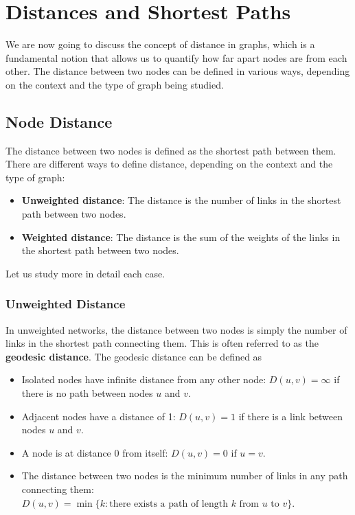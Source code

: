 \section{Distances and Shortest Paths}

We are now going to discuss the concept of distance in graphs, which is a fundamental notion that allows us to quantify how far apart nodes are from each other. The distance between two nodes can be defined in various ways, depending on the context and the type of graph being studied.

\subsection{Node Distance}
The distance between two nodes is defined as the shortest path between them. There are different ways to define distance, depending on the context and the type of graph:
\begin{itemize}
    \item \textbf{Unweighted distance}: The distance is the number of links in the shortest path between two nodes.
    \item \textbf{Weighted distance}: The distance is the sum of the weights of the links in the shortest path between two nodes.
\end{itemize}
Let us study more in detail each case.

\subsubsection{Unweighted Distance}

In unweighted networks, the distance between two nodes is simply the number of links in the shortest path connecting them. This is often referred to as the \textbf{geodesic distance}. The geodesic distance can be defined as
\begin{itemize}
    \item Isolated nodes have infinite distance from any other node: \(D(u,v) = \infty\) if there is no path between nodes \(u\) and \(v\).
    \item Adjacent nodes have a distance of 1: \(D(u,v) = 1\) if there is a link between nodes \(u\) and \(v\).
    \item A node is at distance 0 from itself: \(D(u,v) = 0\) if \(u = v\).
    \item The distance between two nodes is the minimum number of links in any path connecting them: \(D(u,v) = \min\{k : \text{there exists a path of length } k \text{ from } u \text{ to } v\}\).
\end{itemize}

